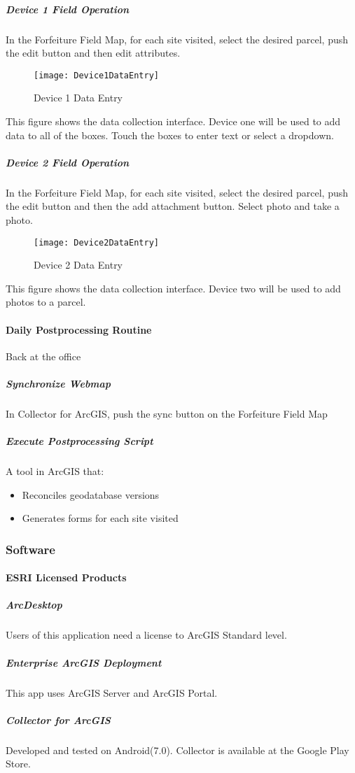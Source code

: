 \documentclass[class=article , crop=false, titlepage, twoside, multi={itemize, figure, verbatim}, float=false]{standalone}
\begin{document}
\clearpage
\subparagraph{Device 1 Field Operation}
\subparagraph*{}In the Forfeiture Field Map, for each site visited, select the desired parcel, push the edit button and then edit attributes.

\begin{wrapfigure}{r}{0.5\textwidth}
\centering
\texttt{[image: Device1DataEntry]}
\caption {Device 1 Data Entry}
\end{wrapfigure}
\vspace{1in}

This figure shows the data collection interface.  Device one will be used to add data to all of the boxes.  Touch the boxes to enter text or select a dropdown.

\clearpage
\subparagraph{Device 2 Field Operation} 
\subparagraph*{}In the Forfeiture Field Map, for each site visited, select the desired parcel, push the edit button and then the add attachment button.  Select photo and take a photo.

\begin{wrapfigure}{l}{0.5\textwidth}
\centering
\texttt{[image: Device2DataEntry]}
\caption {Device 2 Data Entry}
\end{wrapfigure}
\vspace{1in}

This figure shows the data collection interface.  Device two will be used to add photos to a parcel.

\clearpage
\paragraph{Daily Postprocessing Routine}Back at the office
\subparagraph{Synchronize Webmap}In Collector for ArcGIS, push the sync button on the Forfeiture Field Map
\subparagraph{Execute Postprocessing Script}A tool in ArcGIS that:

\begin{itemize}
\item Reconciles geodatabase versions
\item Generates forms for each site visited



\end{itemize}


\clearpage
\subsubsection{Software}
\paragraph{ESRI Licensed Products}
\subparagraph{ArcDesktop}Users of this application need a license to ArcGIS Standard level.

\subparagraph{Enterprise ArcGIS Deployment}This app uses ArcGIS Server and ArcGIS Portal.

\subparagraph{Collector for ArcGIS}Developed and tested on Android(7.0).  Collector is available at the Google Play Store.
\end{document}
